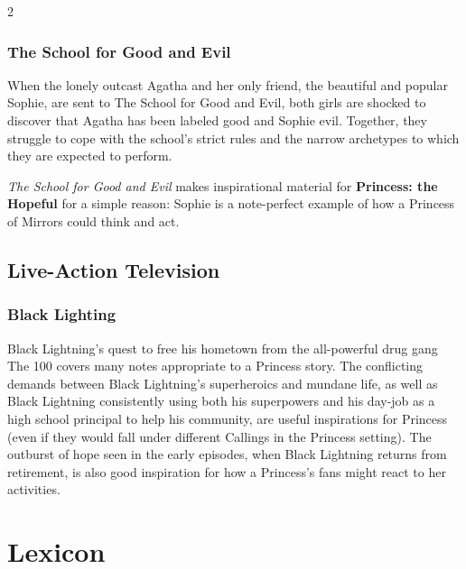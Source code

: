\begin{multicols}{2}
\subsubsection*{The School for Good and Evil}

When the lonely outcast Agatha and her only friend, the beautiful and popular Sophie, are sent to The School for Good and Evil, both girls are shocked to discover that Agatha has been labeled good and Sophie evil. Together, they struggle to cope with the school's strict rules and the narrow archetypes to which they are expected to perform. 

\textit{The School for Good and Evil} makes inspirational material for \textbf{Princess: the Hopeful} for a simple reason: Sophie is a note-perfect example of how a Princess of Mirrors could think and act.

\subsection*{Live-Action Television}

\subsubsection*{Black Lighting}

Black Lightning's quest to free his hometown from the all-powerful drug gang The 100 covers many notes appropriate to a Princess story. The conflicting demands between Black Lightning's superheroics and mundane life, as well as Black Lightning consistently using both his superpowers and his day-job as a high school principal to help his community, are useful inspirations for Princess (even if they would fall under different Callings in the Princess setting). The outburst of hope seen in the early episodes, when Black Lightning returns from retirement, is also good inspiration for how a Princess's fans might react to her activities.

\section*{Lexicon}
\label{sec:lexicon}


\end{multicols}

